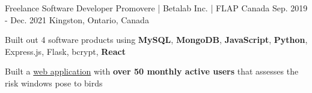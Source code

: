 \begin{cventries}
  \cventry
    {Freelance Software Developer} %
    {Promovere | Betalab Inc. | FLAP Canada} %
    {Sep. 2019 - Dec. 2021} %
    {Kingston, Ontario, Canada} %
    {
      \begin{cvitems} %
        \item{Built out 4 software products using \textbf{MySQL}, \textbf{MongoDB}, \textbf{JavaScript}, \textbf{Python}, Express.js, Flask, bcrypt, \textbf{React}}
        \item {Built a \href{https://www.flapapp.ca/}{web application} with \textbf{over 50 monthly active users} that assesses the risk windows pose to birds}
      \end{cvitems}
    }


\end{cventries}
